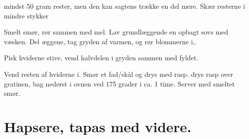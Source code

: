 \documentclass[
]{book}
\begin{document}
mindst 50 gram rester, men den kan sagtens trække en del mere.
Skær resterne i mindre stykker

Smelt smør, rør sammen med mel. Lav grundlæggende en opbagt
sovs med væsken.
Del æggene, tag gryden af varmen, og rør blommerne i,.

Pisk hviderne stive, vend halvdelen i gryden sammen med fyldet.

Vend resten af hviderne i. Smør et fad/skål
og drys med rasp. drys rasp over gratinen, bag nederst i ovnen
ved 175 grader i ca. 1 time. Server med smeltet smør.

\hypertarget{hapsere-tapas-med-videre.}{%
\chapter{Hapsere, tapas med videre.}\label{hapsere-tapas-med-videre.}}
\end{document}
